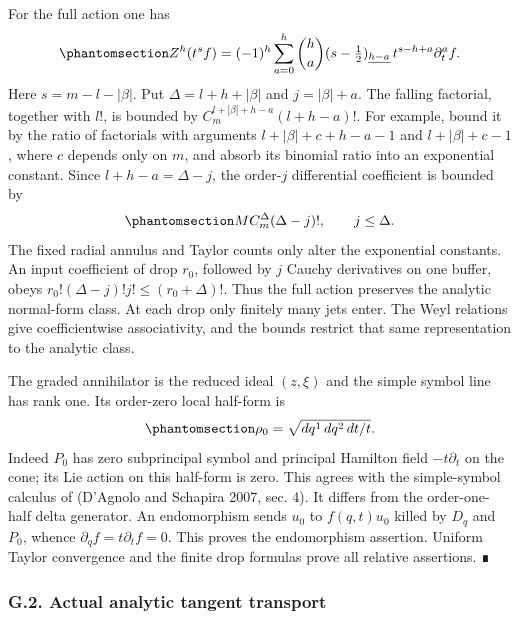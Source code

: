 \documentclass[
  english,
  11pt,
  reqno]{amsart}
\begin{document}
For the full action one has
\begin{equation}\protect\phantomsection\label{eq:gg-module-z-action}{
 Z^h(t^sf)=(-1)^h
   \sum_{a=0}^h\binom ha
    (s-\tfrac12)_{\underline{h-a}}\,
       t^{s-h+a}\partial_t^a f .
}\end{equation} Here \(s=m-l-|\beta|\). Put \(\Delta=l+h+|\beta|\) and
\(j=|\beta|+a\). The falling factorial, together with \(l!\), is bounded
by \(C_m^{l+|\beta|+h-a}(l+h-a)!\). For example, bound it by the ratio
of factorials with arguments \(l+|\beta|+c+h-a-1\) and
\(l+|\beta|+c-1\), where \(c\) depends only on \(m\), and absorb its
binomial ratio into an exponential constant. Since \(l+h-a=\Delta-j\),
the order-\(j\) differential coefficient is bounded by
\begin{equation}\protect\phantomsection\label{eq:gg-module-action-bound}{
 M C_m^\Delta(\Delta-j)!,\qquad j\le\Delta.
}\end{equation} The fixed radial annulus and Taylor counts only alter
the exponential constants. An input coefficient of drop \(r_0\),
followed by \(j\) Cauchy derivatives on one buffer, obeys
\(r_0!(\Delta-j)!j!\le(r_0+\Delta)!\). Thus the full action preserves
the analytic normal-form class. At each drop only finitely many jets
enter. The Weyl relations give coefficientwise associativity, and the
bounds restrict that same representation to the analytic class.

The graded annihilator is the reduced ideal \((z,\xi)\) and the simple
symbol line has rank one. Its order-zero local half-form is
\begin{equation}\protect\phantomsection\label{eq:gg-module-order-zero-half-form}{
 \rho_0=\sqrt{dq^1\,dq^2\,dt/t}.
}\end{equation} Indeed \(P_0\) has zero subprincipal symbol and
principal Hamilton field \(-t\partial_t\) on the cone; its Lie action on
this half-form is zero. This agrees with the simple-symbol calculus of
(D'Agnolo and Schapira 2007, sec. 4). It differs from the order-one-half
delta generator. An endomorphism sends \(u_0\) to \(f(q,t)u_0\) killed
by \(D_q\) and \(P_0\), whence \(\partial_qf=t\partial_tf=0\). This
proves the endomorphism assertion. Uniform Taylor convergence and the
finite drop formulas prove all relative assertions. ∎

\protect{}\label{sec:gg-module-tangent-transport}

\subsubsection{G.2. Actual analytic tangent
transport}\label{g.2.-actual-analytic-tangent-transport}
\end{document}
